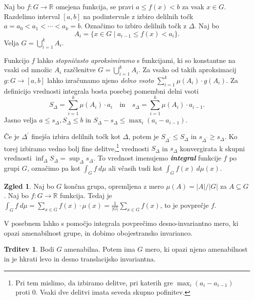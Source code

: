 \documentclass[11pt]{book}
\def\RR{\mathbb{R}}
\def\definicija{\color{rdeca}\bf\em}
\theoremstyle{definition}
\theoremstyle{zgled}
\newtheorem*{zgled}{Zgled}
\theoremstyle{odprtproblem}
\theoremstyle{domacanaloga}
\theoremstyle{izrek}
\newtheorem*{trditev}{Trditev}
\begin{document}
Naj bo $f \colon G \to \RR$ omejena funkcija, se pravi $a \leq f(x) < b$ za vsak $x \in G$. Razdelimo interval $[a,b]$ na podintervale z izbiro delilnih točk $a = a_0 < a_1 < \cdots < a_k = b$. Označimo to izbiro delilnih točk z $\Delta$. Naj bo
\[
A_i = \{ x \in G \mid a_{i-1} \leq f(x) < a_i \}.
\]
Velja $G = \bigcup_{i = 1}^k A_i$. 

Funkcijo $f$ lahko {\em stopničasto aproksimiramo} s funkcijami, ki so konstantne na vsaki od množic $A_i$ razčlenitve $G = \bigcup_{i = 1}^k A_i$. Za vsako od takih aproksimacij $g \colon G \to [a,b]$ lahko izračunamo njeno {\em delno vsoto} $\sum_{i = 1}^k \mu(A_i) \cdot g(A_i)$.
Za definicijo vrednosti integrala bosta posebej pomembni delni vsoti
\[
S_\Delta = \sum_{i = 1}^k \mu(A_i) \cdot a_i \quad
\text{in} \quad
s_\Delta = \sum_{i = 1}^k \mu(A_i) \cdot a_{i-1}.
\]
Jasno velja $a \leq s_\Delta, S_\Delta \leq b$ in $S_\Delta - s_\Delta \leq \max_i (a_i - a_{i-1})$.

Če je $\Delta^\prime$ finejša izbira delilnih točk kot $\Delta$, potem je $S_{\Delta^\prime} \leq S_\Delta$ in $s_{\Delta^\prime} \geq s_\Delta$. Ko torej izbiramo vedno bolj fine delitve,\footnote{Pri tem mislimo, da izbiramo delitve, pri katerih gre $\max_i (a_i - a_{i-1})$ proti $0$. Vsaki dve delitvi imata seveda skupno pofinitev.} vrednosti $S_\Delta$ in $s_\Delta$ konvergirata k skupni vrednosti $\inf_\Delta S_\Delta = \sup_\Delta s_\Delta$. To vrednost imenujemo {\definicija integral} funkcije $f$ po grupi $G$, označimo pa kot $\int_G f \ d \mu$ ali včasih tudi kot $\int_G f(x) \ d \mu(x)$.

\begin{zgled}
Naj bo $G$ končna grupa, opremljena z mero $\mu(A) = |A|/|G|$ za $A \subseteq G$. Naj bo $f \colon G \to \RR$ funkcija. Tedaj je $\int_G f \ d \mu = \sum_{x \in G} f(x) \cdot \mu(x) = \frac{1}{|G|} \sum_{x \in G} f(x)$, to je povprečje $f$. 
\end{zgled}

V posebnem lahko s pomočjo integrala povprečimo desno-invariantno mero, ki opazi amenabilnost grupe, in dobimo obojestransko invarianco.

\begin{trditev}
Bodi $G$ amenabilna. Potem ima $G$ mero, ki opazi njeno amenabilnost in je hkrati levo in desno translacijsko invariantna.
\end{trditev}
\end{document}

